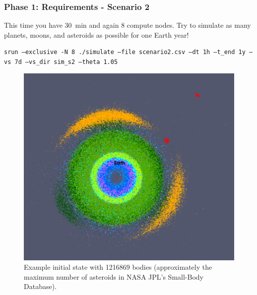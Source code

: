 \begin{frame}[fragile]
  \frametitle{Phase 1: Requirements - Scenario 2}
  This time you have \SI{30}{\minute} and again $8$ compute nodes. Try to simulate as many planets, moons, and asteroids as possible for one Earth year!
  \begin{center}
    \setfontsize{6.8pt}
    \texttt{srun --exclusive -N 8 ./simulate --file scenario2.csv --dt 1h --t_end 1y --vs 7d --vs_dir sim_s2 --theta 1.05} \\[.75em]

    \begin{figure}
        \includegraphics[width=.3\textwidth]{figures/all_bodies_inner_system}
        \caption{Example initial state with \num{1216869} bodies (approximately the maximum number of asteroids in NASA JPL's Small-Body Database).}
    \end{figure}
  \end{center}
\end{frame}

